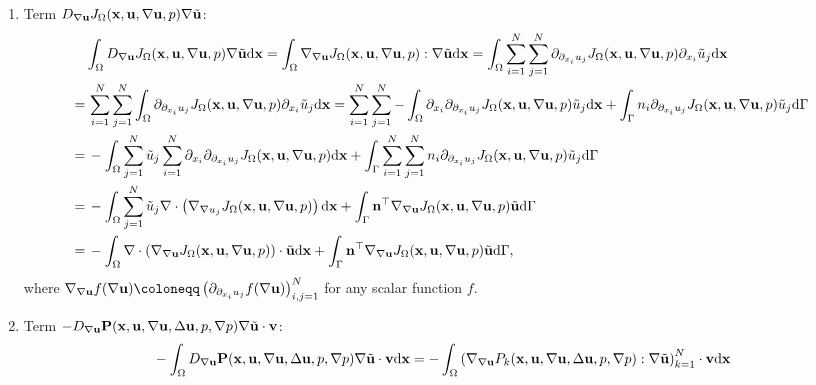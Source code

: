 \documentclass[oneside,11pt]{book}
\numberwithin{equation}{section}
\begin{document}
\begin{enumerate}[leftmargin=0in]
    \item Term $D_{\nabla{\bf u}}J_\Omega({\bf x},{\bf u},\nabla{\bf u},p)\nabla\tilde{\bf u}$:
    \begin{align*}
        &\int_\Omega D_{\nabla{\bf u}} J_\Omega({\bf x},{\bf u},\nabla{\bf u},p)\nabla\tilde{\bf u}{\rm d}{\bf x} = \int_\Omega \nabla_{\nabla{\bf u}}J_\Omega({\bf x},{\bf u},\nabla{\bf u},p):\nabla\tilde{\bf u}{\rm d}{\bf x} = \int_\Omega \sum_{i=1}^N\sum_{j=1}^N \partial_{\partial_{x_i}u_j}J_\Omega({\bf x},{\bf u},\nabla{\bf u},p)\partial_{x_i}\tilde{u}_j{\rm d}{\bf x}\\
        =&\, \sum_{i=1}^N\sum_{j=1}^N \int_\Omega \partial_{\partial_{x_i}u_j}J_\Omega({\bf x},{\bf u},\nabla{\bf u},p)\partial_{x_i}\tilde{u}_j{\rm d}{\bf x} = \sum_{i=1}^N\sum_{j=1}^N -\int_\Omega \partial_{x_i}\partial_{\partial_{x_i}u_j}J_\Omega({\bf x},{\bf u},\nabla{\bf u},p)\tilde{u}_j{\rm d}{\bf x} + \int_\Gamma n_i\partial_{\partial_{x_i}u_j}J_\Omega({\bf x},{\bf u},\nabla{\bf u},p)\tilde{u}_j{\rm d}\Gamma\\
        =&\, -\int_\Omega \sum_{j=1}^N \tilde{u}_j\sum_{i=1}^N \partial_{x_i}\partial_{\partial_{x_i}u_j}J_\Omega({\bf x},{\bf u},\nabla{\bf u},p){\rm d}{\bf x} + \int_\Gamma \sum_{i=1}^N\sum_{j=1}^N n_i\partial_{\partial_{x_i}u_j}J_\Omega({\bf x},{\bf u},\nabla{\bf u},p)\tilde{u}_j{\rm d}\Gamma\\
        =&\, -\int_\Omega \sum_{j=1}^N \tilde{u}_j\nabla\cdot\left(\nabla_{\nabla u_j}J_\Omega({\bf x},{\bf u},\nabla{\bf u},p)\right){\rm d}{\bf x} + \int_\Gamma {\bf n}^\top\nabla_{\nabla{\bf u}}J_\Omega({\bf x},{\bf u},\nabla{\bf u},p)\tilde{\bf u}{\rm d}\Gamma\\
        =&\, -\int_\Omega \nabla\cdot\left(\nabla_{\nabla{\bf u}}J_\Omega({\bf x},{\bf u},\nabla{\bf u},p)\right)\cdot\tilde{\bf u}{\rm d}{\bf x} + \int_\Gamma {\bf n}^\top\nabla_{\nabla{\bf u}}J_\Omega({\bf x},{\bf u},\nabla{\bf u},p)\tilde{\bf u}{\rm d}\Gamma,
    \end{align*}
    where $\nabla_{\nabla{\bf u}} f(\nabla{\bf u})\coloneqq\left(\partial_{\partial_{x_i}u_j}f(\nabla{\bf u})\right)_{i,j=1}^N$ for any scalar function $f$.
    \item Term $- D_{\nabla{\bf u}}{\bf P}({\bf x},{\bf u},\nabla{\bf u},\Delta{\bf u},p,\nabla p)\nabla\tilde{\bf u}\cdot{\bf v}$:
    \begin{align*}
        &-\int_\Omega D_{\nabla{\bf u}}{\bf P}({\bf x},{\bf u},\nabla{\bf u},\Delta{\bf u},p,\nabla p)\nabla\tilde{\bf u}\cdot{\bf v}{\rm d}{\bf x} = -\int_\Omega \left(\nabla_{\nabla{\bf u}}P_k({\bf x},{\bf u},\nabla{\bf u},\Delta{\bf u},p,\nabla p):\nabla\tilde{\bf u}\right)_{k=1}^N\cdot{\bf v}{\rm d}{\bf x}\\

\end{align*}
\end{enumerate}
\end{document}
